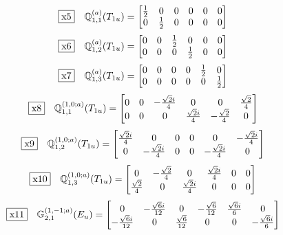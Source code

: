 \documentclass[fleqn,10pt,landscape]{jsarticle}
\begin{document}
\begin{dmath*}
\fbox{x5}\quad \mathbb{Q}_{1,1}^{(a)}(T_{1u})=\begin{bmatrix} \frac{1}{2} & 0 & 0 & 0 & 0 & 0 \\ 0 & \frac{1}{2} & 0 & 0 & 0 & 0 \end{bmatrix}
\end{dmath*}
\begin{dmath*}
\fbox{x6}\quad \mathbb{Q}_{1,2}^{(a)}(T_{1u})=\begin{bmatrix} 0 & 0 & \frac{1}{2} & 0 & 0 & 0 \\ 0 & 0 & 0 & \frac{1}{2} & 0 & 0 \end{bmatrix}
\end{dmath*}
\begin{dmath*}
\fbox{x7}\quad \mathbb{Q}_{1,3}^{(a)}(T_{1u})=\begin{bmatrix} 0 & 0 & 0 & 0 & \frac{1}{2} & 0 \\ 0 & 0 & 0 & 0 & 0 & \frac{1}{2} \end{bmatrix}
\end{dmath*}
\begin{dmath*}
\fbox{x8}\quad \mathbb{Q}_{1,1}^{(1,0;a)}(T_{1u})=\begin{bmatrix} 0 & 0 & - \frac{\sqrt{2} i}{4} & 0 & 0 & \frac{\sqrt{2}}{4} \\ 0 & 0 & 0 & \frac{\sqrt{2} i}{4} & - \frac{\sqrt{2}}{4} & 0 \end{bmatrix}
\end{dmath*}
\begin{dmath*}
\fbox{x9}\quad \mathbb{Q}_{1,2}^{(1,0;a)}(T_{1u})=\begin{bmatrix} \frac{\sqrt{2} i}{4} & 0 & 0 & 0 & 0 & - \frac{\sqrt{2} i}{4} \\ 0 & - \frac{\sqrt{2} i}{4} & 0 & 0 & - \frac{\sqrt{2} i}{4} & 0 \end{bmatrix}
\end{dmath*}
\begin{dmath*}
\fbox{x10}\quad \mathbb{Q}_{1,3}^{(1,0;a)}(T_{1u})=\begin{bmatrix} 0 & - \frac{\sqrt{2}}{4} & 0 & \frac{\sqrt{2} i}{4} & 0 & 0 \\ \frac{\sqrt{2}}{4} & 0 & \frac{\sqrt{2} i}{4} & 0 & 0 & 0 \end{bmatrix}
\end{dmath*}
\begin{dmath*}
\fbox{x11}\quad \mathbb{G}_{2,1}^{(1,-1;a)}(E_{u})=\begin{bmatrix} 0 & - \frac{\sqrt{6} i}{12} & 0 & - \frac{\sqrt{6}}{12} & \frac{\sqrt{6} i}{6} & 0 \\ - \frac{\sqrt{6} i}{12} & 0 & \frac{\sqrt{6}}{12} & 0 & 0 & - \frac{\sqrt{6} i}{6} \end{bmatrix}
\end{dmath*}
\end{document}
